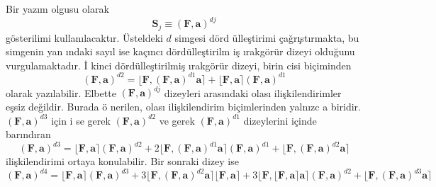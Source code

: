 \documentclass[a4paper,10pt]{article}
\begin{document}
Bir yaz\i m olgusu olarak %
\begin{equation}
 \mathbf{S}_{j} \equiv \left(\mathbf{F},\mathbf{a}\right)^{dj}
\end{equation}
g\"osterilimi kullan\i lacakt\i r. \"Usteldeki $d$ simgesi d\"ord%
\"ulle\c{s}tirimi \c{c}a\u{g}r\i \c{}st\i rmakta, bu simgenin yan%
\i ndaki say\i l ise ka\c{c}\i nc{\i} d\"ord\"ulle\c{s}ti\-ril\-m%
i\c{s} \i rakg\"or\"ur dizeyi oldu\u{g}unu vurgulamaktad\i r. \.I%
kinci d\"ord\"ulle\c{s}tirilmi\c{s} \i rakg\"or\"ur dizeyi, birin%
cisi bi\c{c}iminden %
\begin{equation}
 \left(\mathbf{F},\mathbf{a}\right)^{d2} = 
 \lfloor \mathbf{F} , \left(\mathbf{F},
 \mathbf{a}\right)^{d1}\mathbf{a} \rceil
 + \lfloor \mathbf{F} , 
 \mathbf{a} \rceil \left(\mathbf{F},\mathbf{a}\right)^{d1}
\end{equation}
olarak yaz\i labilir. Elbette %
$\left(\mathbf{F},\mathbf{a}\right)^{dj}$ dizeyleri aras\i ndaki %
olas{\i} ili\c{s}kilendirimler e\c{s}siz de\u{g}ildir. Burada \"o%
nerilen, olas{\i} ili\c{s}kilendirim bi\c{c}imlerinden yaln{\i}zc%
a biridir. $\left(\mathbf{F},\mathbf{a}\right)^{d3}$ i\-\c{c}in i%
se gerek $\left(\mathbf{F},\mathbf{a}\right)^{d2}$ ve gerek %
$\left(\mathbf{F},\mathbf{a}\right)^{d1}$ dizeylerini i\c{c}inde %
bar\i nd\i ran %
\begin{equation}
 \left(\mathbf{F},\mathbf{a}\right)^{d3} =
 \lfloor \mathbf{F} , \mathbf{a} \rceil 
 \left(\mathbf{F},\mathbf{a}\right)^{d2}
 + 2 \lfloor \mathbf{F} , \left(\mathbf{F},%
 \mathbf{a}\right)^{d1}\mathbf{a} \rceil
 \left(\mathbf{F},\mathbf{a}\right)^{d1}
 + \lfloor \mathbf{F} , \left(\mathbf{F},%
 \mathbf{a}\right)^{d2}\mathbf{a} \rceil
\end{equation}
ili\c{s}kilendirimi ortaya konulabilir. Bir sonraki dizey ise %
\begin{equation}
 \left(\mathbf{F},\mathbf{a}\right)^{d4} = 
 \lfloor \mathbf{F} , \mathbf{a} \rceil 
 \left(\mathbf{F},\mathbf{a}\right)^{d3}
 + 3 \lfloor \mathbf{F} , \left(\mathbf{F},%
 \mathbf{a}\right)^{d2}\mathbf{a} \rceil
 \lfloor \mathbf{F} , \mathbf{a} \rceil 
 + 3 \lfloor \mathbf{F} , \lfloor \mathbf{F} , 
 \mathbf{a} \rceil \mathbf{a} \rceil
 \left(\mathbf{F},\mathbf{a}\right)^{d2}
 + \lfloor \mathbf{F} , \left(\mathbf{F},%
 \mathbf{a}\right)^{d3}\mathbf{a} \rceil
\end{equation}
\end{document}
